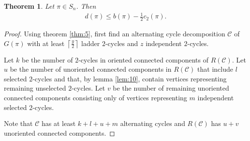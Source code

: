 \documentclass[11pt,DIV=11]{scrartcl}
\newtheorem{theorem}{Theorem}[section]
\theoremstyle{definition}
\theoremstyle{remark}
\begin{document}
\begin{theorem}
\label{thm:6}
Let $\pi \in S_n$. Then
\begin{align*}
    d(\pi) \leq b(\pi) - \frac{1}{2} c_2(\pi).
\end{align*}
\end{theorem}

\begin{proof}
Using theorem \ref{thm:5}, first find an alternating cycle decomposition $\mathcal{C}$ of $G(\pi)$ with at least $\left\lceil \frac{y}{2} \right\rceil$ ladder $2$-cycles and $z$ independent $2$-cycles.

Let $k$ be the number of $2$-cycles in oriented connected components of $R(\mathcal{C})$. Let $u$ be the number of unoriented connected components in $R(\mathcal{C})$ that include $l$ selected $2$-cycles and that, by lemma \ref{lem:10}, contain vertices representing remaining unselected $2$-cycles. Let $v$ be the number of remaining unoriented connected components consisting only of vertices representing $m$ independent selected $2$-cycles.

Note that $\mathcal{C}$ has at least $k+l+u+m$ alternating cycles and $R(\mathcal{C})$ has $u+v$ unoriented connected components.


\end{proof}
\end{document}
